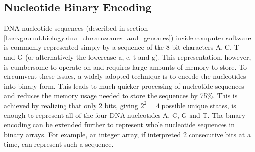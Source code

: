 \subsection{Nucleotide Binary Encoding} \label{background:nucleotide_binary_encoding}

DNA nucleotide sequences (described in section \ref{background:biology:dna_chromosomes_and_genomes}) inside computer software is commonly represented simply by a sequence of the 8 bit characters A, C, T and G (or alternatively the lowercase a, c, t and g).
This representation, however, is cumbersome to operate on and requires large amounts of memory to store.
To circumvent these issues, a widely adopted technique is to encode the nucleotides into binary form.
This leads to much quicker processing of nucleotide sequences and reduces the memory usage needed to store the sequences by 75\%.
This is achieved by realizing that only 2 bits, giving \textit{$2^2=4$} possible unique states, is enough to represent all of the four DNA nucleotides A, C, G and T.
The binary encoding can be extended further to represent whole nucleotide sequences in binary arrays.
For example, an integer array, if interpreted 2 consecutive bits at a time, can represent such a sequence.

